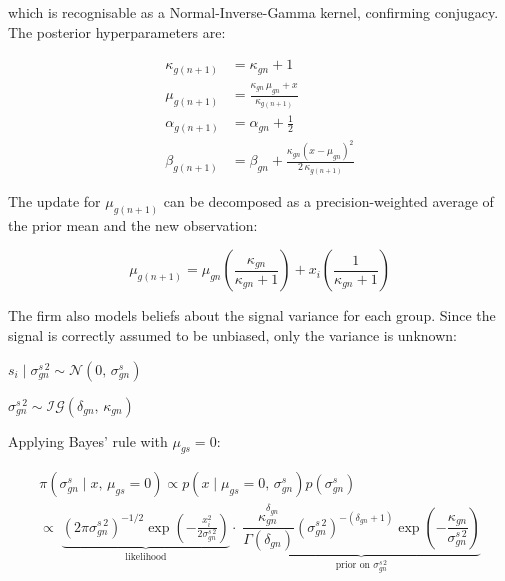 \documentclass[]{article}
\begin{document}
\noindent which is recognisable as a Normal-Inverse-Gamma kernel, confirming conjugacy. 
The posterior hyperparameters are:

\begin{align*}
	\kappa_{g(n+1)} &= \kappa_{gn} + 1 \\[6pt]
	\mu_{g(n+1)}    &= \frac{\kappa_{gn}\,\mu_{gn} + x}{\kappa_{g(n+1)}} \\[6pt]
	\alpha_{g(n+1)} &= \alpha_{gn} + \frac{1}{2} \\[6pt]
	\beta_{g(n+1)}  &= \beta_{gn} + 
	\frac{\kappa_{gn}(x - \mu_{gn})^2}{2\,\kappa_{g(n+1)}}
\end{align*}

\noindent The update for $\mu_{g(n+1)}$ can be decomposed as a 
precision-weighted average of the prior mean and the new observation:

\begin{equation*}
	\mu_{g(n+1)} = \mu_{gn}\left(\frac{\kappa_{gn}}{\kappa_{gn}+1}\right) 
	+ x_i\left(\frac{1}{\kappa_{gn}+1}\right)
\end{equation*}

\noindent The firm also models beliefs about the signal variance for each group. 
Since the signal is correctly assumed to be unbiased, only the variance is unknown:

\begin{center}
	\vspace{0.2cm}
	$s_i \mid \sigma^{s\,2}_{gn} \sim \mathcal{N}\!\left(0,\, \sigma^s_{gn}\right)$
	\vspace{0.2cm}
	
	$\sigma^{s\,2}_{gn} \sim \mathcal{IG}\!\left(\delta_{gn},\, \kappa_{gn}\right)$
	\vspace{0.2cm}
\end{center}

\noindent Applying Bayes' rule with $\mu_{gs} = 0$:

\begin{gather*}
	\pi\!\left(\sigma^s_{gn} \mid x,\, \mu_{gs} = 0\right) \propto
	p\!\left(x \mid \mu_{gs}=0,\, \sigma^s_{gn}\right) p\!\left(\sigma^s_{gn}\right)\\[10pt]
	\propto\;
	\underbrace{\left(2\pi\sigma^{s\,2}_{gn}\right)^{-1/2}
		\exp\!\left(-\frac{x_i^2}{2\sigma^{s\,2}_{gn}}\right)
	}_{\text{likelihood}}
	\cdot\;
	\underbrace{\dfrac{\kappa_{gn}^{\delta_{gn}}}{\Gamma(\delta_{gn})}
		\left(\sigma^{s\,2}_{gn}\right)^{-(\delta_{gn}+1)}
		\exp\!\left(-\dfrac{\kappa_{gn}}{\sigma^{s\,2}_{gn}}\right)
	}_{\text{prior on }\sigma^{s\,2}_{gn}}
\end{gather*}
\end{document}
